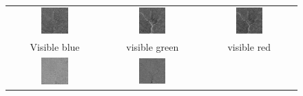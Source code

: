 \documentclass[11pt,a4paper]{article}
\begin{document}
\begin{figure}[!htbp]
	\centering
	\begin{tabular}{ccc} 
		\includegraphics[width=0.3\textwidth]{pro10/PC/11_42_a}&
		\includegraphics[width=0.3\textwidth]{pro10/PC/11_42_b}&
		\includegraphics[width=0.3\textwidth]{pro10/PC/11_42_c}\\
		 Visible blue & visible green  & visible red\\
		\includegraphics[width=0.3\textwidth]{pro10/PC/11_42_d}&
		\includegraphics[width=0.3\textwidth]{pro10/PC/11_42_e}&

\end{tabular}
\end{figure}
\end{document}
